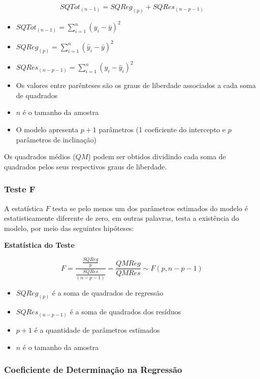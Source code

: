 \documentclass[
]{estat/estat}
\providecommand{\tightlist}{%
  \setlength{\itemsep}{0pt}\setlength{\parskip}{0pt}}\usepackage{longtable,booktabs,array}
\begin{document}
\[
SQTot_{(n-1)}=SQReg_{(p)}+SQRes_{(n-p-1)}
\]

\begin{itemize}
\tightlist
\item
  \(SQTot_{(n-1)}=\displaystyle\sum_{i=1}^n{(y_i-\bar{y})^2}\)
\item
  \(SQReg_{(p)}=\displaystyle\sum_{i=1}^n{(\hat{y}_i-\bar{y})^2}\)
\item
  \(SQRes_{(n-p-1)}=\displaystyle\sum_{i=1}^n{(y_i-\hat{y}_i)^2}\)
\item
  Os valores entre parênteses são os graus de liberdade associados a
  cada soma de quadrados
\item
  \(n\) é o tamanho da amostra
\item
  O modelo apresenta \(p+1\) parâmetros (1 coeficiente do intercepto e
  \(p\) parâmetros de inclinação)
\end{itemize}

Os quadrados médios (\(QM\)) podem ser obtidos dividindo cada soma de
quadrados pelos seus respectivos graus de liberdade.

\subsubsection{Teste F}\label{teste-f}

A estatística \(F\) testa se pelo menos um dos parâmetros estimados do
modelo é estatisticamente diferente de zero, em outras palavras, testa a
existência do modelo, por meio das seguintes hipóteses:


\textbf{Estatística do Teste}

\[
F = \frac{\frac{SQReg}{p}}{\frac{SQRes}{(n-p-1)}} = \frac{QMReg}{QMRes} \sim F(p, n-p-1)
\]

\begin{itemize}
\tightlist
\item
  \(SQReg_{(p)}\) é a soma de quadrados de regressão
\item
  \(SQRes_{(n-p-1)}\) é a soma de quadrados dos resíduos
\item
  \(p+1\) é a quantidade de parâmetros estimados
\item
  \(n\) é o tamanho da amostra
\end{itemize}

\subsubsection{Coeficiente de Determinação na
Regressão}\label{coeficiente-de-determinauxe7uxe3o-na-regressuxe3o}
\end{document}
